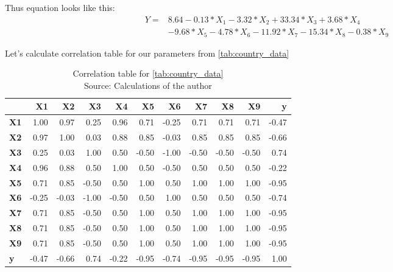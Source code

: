 Thus equation looks like this:
\begin{equation} \label{eq:OLS_1_coeffs}
\begin{split}
    Y = & 8.64 -0.13*X_1 -3.32*X_2 +33.34*X_3 +3.68*X_4 \\
    &-9.68*X_5 -4.78*X_6 -11.92*X_7 -15.34*X_8 -0.38*X_9
\end{split}
\end{equation}

Let's calculate correlation table for our parameters from
\ref{tab:country_data}

\begin{table}[!htbp]
    \begin{tabular}{lrrrrrrrrrr}
    \toprule
    {} &    \textbf{X1} &    \textbf{X2} &    \textbf{X3} &    \textbf{X4} &    \textbf{X5} &    \textbf{X6} &    \textbf{X7} &    \textbf{X8} &    \textbf{X9} &     \textbf{y} \\
    \midrule
    \textbf{X1} &  1.00 &  0.97 &  0.25 &  0.96 &  0.71 & -0.25 &  0.71 &  0.71 &  0.71 & -0.47 \\
    \textbf{X2} &  0.97 &  1.00 &  0.03 &  0.88 &  0.85 & -0.03 &  0.85 &  0.85 &  0.85 & -0.66 \\
    \textbf{X3} &  0.25 &  0.03 &  1.00 &  0.50 & -0.50 & -1.00 & -0.50 & -0.50 & -0.50 &  0.74 \\
    \textbf{X4} &  0.96 &  0.88 &  0.50 &  1.00 &  0.50 & -0.50 &  0.50 &  0.50 &  0.50 & -0.22 \\
    \textbf{X5} &  0.71 &  0.85 & -0.50 &  0.50 &  1.00 &  0.50 &  1.00 &  1.00 &  1.00 & -0.95 \\
    \textbf{X6} & -0.25 & -0.03 & -1.00 & -0.50 &  0.50 &  1.00 &  0.50 &  0.50 &  0.50 & -0.74 \\
    \textbf{X7} &  0.71 &  0.85 & -0.50 &  0.50 &  1.00 &  0.50 &  1.00 &  1.00 &  1.00 & -0.95 \\
    \textbf{X8} &  0.71 &  0.85 & -0.50 &  0.50 &  1.00 &  0.50 &  1.00 &  1.00 &  1.00 & -0.95 \\
    \textbf{X9} &  0.71 &  0.85 & -0.50 &  0.50 &  1.00 &  0.50 &  1.00 &  1.00 &  1.00 & -0.95 \\
    \textbf{y}  & -0.47 & -0.66 &  0.74 & -0.22 & -0.95 & -0.74 & -0.95 & -0.95 & -0.95 &  1.00 \\
    \bottomrule
    \end{tabular}
    \caption{Correlation table for \ref{tab:country_data} \\ Source: Calculations of the author}
    \label{tab:corr_full}
\end{table}

